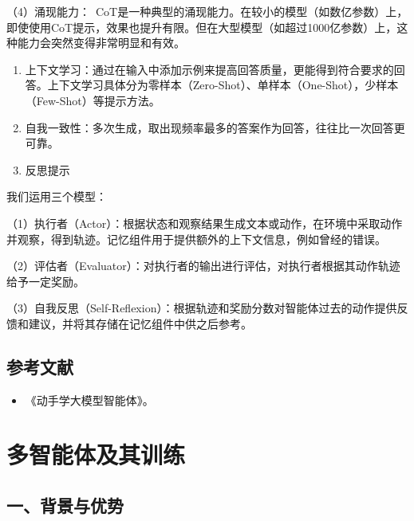 （4）涌现能力：~CoT是一种典型的涌现能力。在较小的模型（如数亿参数）上，即使使用CoT提示，效果也提升有限。但在大型模型（如超过1000亿参数）上，这种能力会突然变得非常明显和有效。

\begin{enumerate}
\def\labelenumi{\arabic{enumi}.}
\setcounter{enumi}{1}
\item
  上下文学习：通过在输入中添加示例来提高回答质量，更能得到符合要求的回答。上下文学习具体分为零样本（Zero-Shot）、单样本（One-Shot），少样本（Few-Shot）等提示方法。
\item
  自我一致性：多次生成，取出现频率最多的答案作为回答，往往比一次回答更可靠。
\item
  反思提示
\end{enumerate}

我们运用三个模型：

（1）执行者（Actor）：根据状态和观察结果生成文本或动作，在环境中采取动作并观察，得到轨迹。记忆组件用于提供额外的上下文信息，例如曾经的错误。

（2）评估者（Evaluator）：对执行者的输出进行评估，对执行者根据其动作轨迹给予一定奖励。

（3）自我反思（Self-Reflexion）：根据轨迹和奖励分数对智能体过去的动作提供反馈和建议，并将其存储在记忆组件中供之后参考。

\hypertarget{ux53c2ux8003ux6587ux732e-116}{%
\subsection{参考文献}\label{ux53c2ux8003ux6587ux732e-116}}

\begin{itemize}
\tightlist
\item
  《动手学大模型智能体》。
\end{itemize}

\clearpage

\hypertarget{ux591aux667aux80fdux4f53ux53caux5176ux8badux7ec3}{%
\section{多智能体及其训练}\label{ux591aux667aux80fdux4f53ux53caux5176ux8badux7ec3}}

\hypertarget{ux4e00ux80ccux666fux4e0eux4f18ux52bf}{%
\subsection{一、背景与优势}\label{ux4e00ux80ccux666fux4e0eux4f18ux52bf}}

